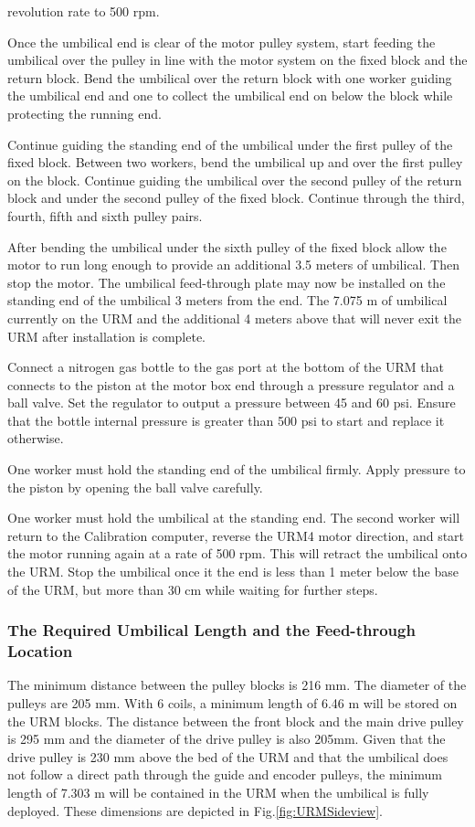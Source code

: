 \documentclass[11pt]{article}
\begin{document}
\begin{answerlist}
  revolution rate to 500 rpm.
\item Once the umbilical end is clear of the motor pulley system,
  start feeding the umbilical over the pulley in line with the motor
  system on the fixed block and the return block. Bend the umbilical
  over the return block with one worker guiding the umbilical end and
  one to collect the umbilical end on below the block while protecting
  the running end.
\item Continue guiding the standing end of the umbilical under the
  first pulley of the fixed block. Between two workers, bend the
  umbilical up and over the first pulley on the block. Continue
  guiding the umbilical over the second pulley of the return block and
  under the second pulley of the fixed block. Continue through the
  third, fourth, fifth and sixth pulley pairs.
\item After bending the umbilical under the sixth pulley of the fixed
  block allow the motor to run long enough to provide an additional 3.5
  meters of umbilical. Then stop the motor. The umbilical feed-through
  plate may now be installed on the standing end of the umbilical 3
  meters from the end. The 7.075 m of umbilical currently on the URM
  and the additional 4 meters above that will never exit the URM after
  installation is complete.
\item Connect a nitrogen gas bottle to the gas port at the bottom of
  the URM that connects to the piston at the motor box end through a
  pressure regulator and a ball valve. Set the regulator to output a
  pressure between 45 and 60 psi.  Ensure that the bottle internal
  pressure is greater than 500 psi to start and replace it otherwise.
\item One worker must hold the standing end of the umbilical
  firmly. Apply pressure to the piston by opening the ball valve
  carefully.
\item One worker must hold the umbilical at the standing end. The
  second worker will return to the Calibration computer, reverse the
  URM4 motor direction, and start the motor running again at a rate of
  500 rpm. This will retract the umbilical onto the URM. Stop the
  umbilical once it the end is less than 1 meter below the base of the
  URM, but more than 30 cm while waiting for further steps.
\end{answerlist}

\subsubsection{The Required Umbilical Length and the Feed-through Location}
The minimum distance between the pulley blocks is 216 mm. The diameter
of the pulleys are 205 mm. With 6 coils, a minimum length of 6.46 m
will be stored on the URM blocks. The distance between the front block
and the main drive pulley is 295 mm and the diameter of the drive
pulley is also 205mm. Given that the drive pulley is 230 mm above the
bed of the URM and that the umbilical does not follow a direct path
through the guide and encoder pulleys, the minimum length of 7.303 m
will be contained in the URM when the umbilical is fully
deployed. These dimensions are depicted in
Fig.\ref{fig:URMSideview}.
\end{document}
